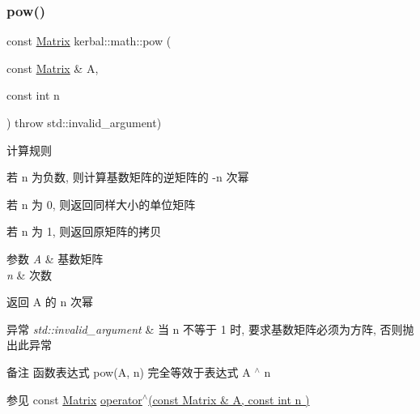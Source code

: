 \subsubsection{\texorpdfstring{pow()}{pow()}}
{\footnotesize\ttfamily const \hyperlink{classkerbal_1_1math_1_1_matrix}{Matrix} kerbal\+::math\+::pow (\begin{DoxyParamCaption}\item[{const \hyperlink{classkerbal_1_1math_1_1_matrix}{Matrix} \&}]{A,  }\item[{const int}]{n }\end{DoxyParamCaption}) throw  std\+::invalid\+\_\+argument) }

\begin{DoxyParagraph}{计算规则}

\begin{DoxyItemize}
\item 若 n 为负数, 则计算基数矩阵的逆矩阵的 -\/n 次幂~\newline

\item 若 n 为 0, 则返回同样大小的单位矩阵~\newline

\item 若 n 为 1, 则返回原矩阵的拷贝 
\end{DoxyItemize}
\end{DoxyParagraph}

\begin{DoxyParams}{参数}
{\em A} & 基数矩阵 \\
\hline
{\em n} & 次数 \\
\hline
\end{DoxyParams}
\begin{DoxyReturn}{返回}
A 的 n 次幂 
\end{DoxyReturn}

\begin{DoxyExceptions}{异常}
{\em std\+::invalid\+\_\+argument} & 当 n 不等于 1 时, 要求基数矩阵必须为方阵, 否则抛出此异常 \\
\hline
\end{DoxyExceptions}
\begin{DoxyRemark}{备注}
函数表达式 pow(\+A, n) 完全等效于表达式 A $^\wedge$ n 
\end{DoxyRemark}
\begin{DoxySeeAlso}{参见}
const \hyperlink{classkerbal_1_1math_1_1_matrix}{Matrix} \hyperlink{namespacekerbal_1_1math_aaa366f09d5d49a57ed544d64eee47c38}{operator$^\wedge$(const Matrix \& A, const int n )} 
\end{DoxySeeAlso}
